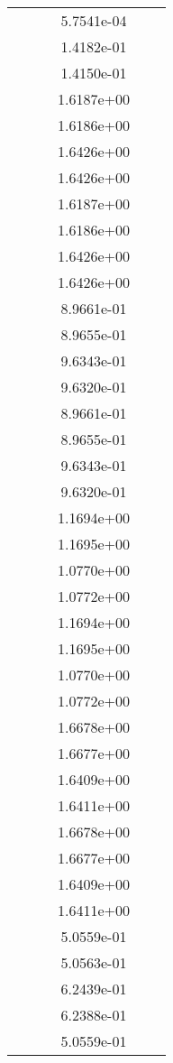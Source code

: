 \begin{xltabular}{\textwidth}{r|rS[table-format=1.3e+2]S[table-format=1.4e+2]S[table-format=1.4e+2]S[table-format=-1.5]}
&  &  & 5.7541e-04 & & \\
&  &  & 1.4182e-01 & & \\
&  &  & 1.4150e-01 & & \\
&  &  & 1.6187e+00 & & \\
&  &  & 1.6186e+00 & & \\
&  &  & 1.6426e+00 & & \\
&  &  & 1.6426e+00 & & \\
&  &  & 1.6187e+00 & & \\
&  &  & 1.6186e+00 & & \\
&  &  & 1.6426e+00 & & \\
&  &  & 1.6426e+00 & & \\
&  &  & 8.9661e-01 & & \\
&  &  & 8.9655e-01 & & \\
&  &  & 9.6343e-01 & & \\
&  &  & 9.6320e-01 & & \\
&  &  & 8.9661e-01 & & \\
&  &  & 8.9655e-01 & & \\
&  &  & 9.6343e-01 & & \\
&  &  & 9.6320e-01 & & \\
&  &  & 1.1694e+00 & & \\
&  &  & 1.1695e+00 & & \\
&  &  & 1.0770e+00 & & \\
&  &  & 1.0772e+00 & & \\
&  &  & 1.1694e+00 & & \\
&  &  & 1.1695e+00 & & \\
&  &  & 1.0770e+00 & & \\
&  &  & 1.0772e+00 & & \\
&  &  & 1.6678e+00 & & \\
&  &  & 1.6677e+00 & & \\
&  &  & 1.6409e+00 & & \\
&  &  & 1.6411e+00 & & \\
&  &  & 1.6678e+00 & & \\
&  &  & 1.6677e+00 & & \\
&  &  & 1.6409e+00 & & \\
&  &  & 1.6411e+00 & & \\
&  &  & 5.0559e-01 & & \\
&  &  & 5.0563e-01 & & \\
&  &  & 6.2439e-01 & & \\
&  &  & 6.2388e-01 & & \\
&  &  & 5.0559e-01 & & \\

\end{xltabular}
